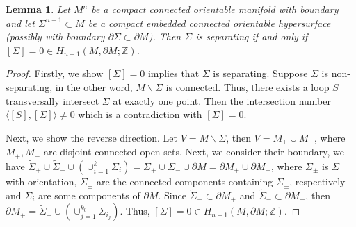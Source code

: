 \documentclass[11pt,letterpaper]{amsart}
\newtheorem{lemma}[theorem]{Lemma}
\theoremstyle{definition}
\theoremstyle{remark}
\numberwithin{equation}{section}
\begin{document}
\begin{lemma}\label{separate}
    Let $M^{n}$ be a compact connected orientable manifold with boundary and let $\Sigma^{n-1}\subset M$ be a compact embedded connected orientable hypersurface (possibly with boundary $\partial\Sigma\subset \partial M$).
    Then $\Sigma$ is separating if and only if $[\Sigma] = 0\in H_{n-1}(M,\partial M;\mathbb{Z})$.
\end{lemma}

\begin{proof}
    Firstly, we show $[\Sigma]=0$ implies that $\Sigma$ is separating. Suppose $\Sigma$ is non-separating, in the other word, $M\backslash \Sigma$ is connected. Thus, there exists a loop $S$ transversally intersect $\Sigma$ at exactly one point. Then the intersection number $\langle [S],[\Sigma]\rangle \neq 0$ which is a contradiction with $[\Sigma]=0$.
    
    Next, we show the reverse direction. Let $V=M\backslash \Sigma$, then $V=M_{+}\cup M_{-}$, where $M_{+},M_{-}$ are disjoint connected open sets. Next, we consider their boundary, we have $\tilde{\Sigma}_{+}\cup \tilde{\Sigma}_{-}\cup(\cup_{i=1}^{k} \Sigma_{i})=\Sigma_{+}\cup \Sigma_{-}\cup \partial M = \partial M_{+}\cup \partial M_{-}$, where $\Sigma_{\pm}$ is $\Sigma$ with orientation, $\tilde{\Sigma}_{\pm}$ are the connected components containing $\Sigma_{\pm}$, respectively and $\Sigma_{i}$ are some components of $\partial M$. Since $\tilde{\Sigma}_{+}\subset \partial M_{+}$ and $\tilde{\Sigma}_{-}\subset \partial M_{-}$, then $\partial M_{+} = \tilde{\Sigma}_{+}\cup (\cup_{j=1}^{k_{0}}\Sigma_{i_{j}})$. Thus, $[\Sigma]=0\in H_{n-1}(M,\partial M;\mathbb{Z})$.
\end{proof}
\end{document}
